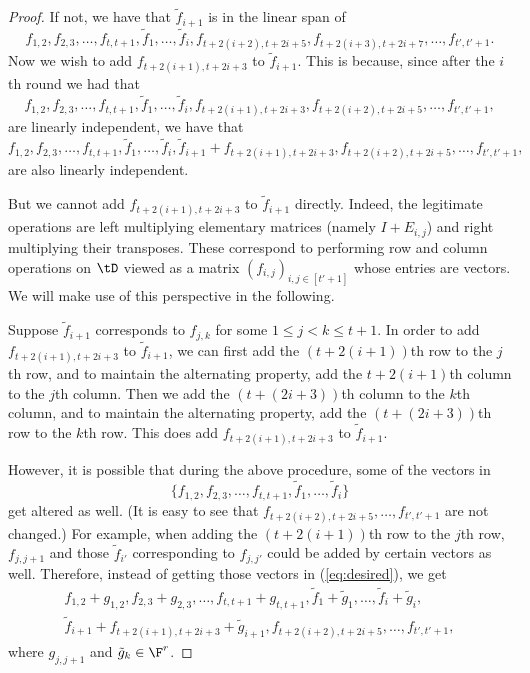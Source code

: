 \begin{proof}
If not, we have that $\tilde f_{i+1}$ is in the linear span of 
$$f_{1, 
2}, f_{2,3}, \dots, f_{t, t+1}, \tilde f_1, 
\dots, \tilde f_i, f_{t+2(i+2), t+2i+5}, 
f_{t+2(i+3), t+2i+7}, \dots, f_{t', 
t'+1}.$$ 
Now we 
wish to add $f_{t+2(i+1), t+2i+3}$ to 
$\tilde f_{i+1}$. This is because, since after the $i$th round we had that
\begin{equation}\label{eq:cond}
f_{1, 2}, f_{2,3}, 
\dots, f_{t, t+1}, \tilde f_1, 
\dots, \tilde f_i, f_{t+2(i+1), t+2i+3}, f_{t+2(i+2), t+2i+5}, \dots, f_{t', 
t'+1},
\end{equation}
are linearly independent, we have that 
\begin{equation}\label{eq:desired}
f_{1, 2}, f_{2,3}, 
\dots, f_{t, t+1}, \tilde f_1, 
\dots, \tilde f_i, \tilde f_{i+1}+f_{t+2(i+1), t+2i+3}, f_{t+2(i+2), t+2i+5}, 
\dots, f_{t', 
t'+1},
\end{equation}
are also linearly independent. 

But we cannot add $f_{t+2(i+1), t+2i+3}$ to 
$\tilde f_{i+1}$ directly. Indeed, the legitimate operations are left multiplying  
elementary matrices (namely $I+E_{i,j}$) and right multiplying 
their transposes. 
These 
correspond to performing row and column operations on $\tD$ viewed as a matrix 
$(f_{i,j})_{i,j\in[t'+1]}$ whose entries are vectors. We will make use of this 
perspective in the following. 

Suppose $\tilde f_{i+1}$ corresponds to 
$f_{j, k}$ for 
some $1\leq j<k\leq t+1$. In order to add $f_{t+2(i+1), t+2i+3}$ to 
$\tilde f_{i+1}$, we can first add the $(t+2(i+1))$th row to the $j$th row, and to 
maintain the alternating property, add 
the $t+2(i+1)$th column to the $j$th column. Then we add the $(t+(2i+3))$th column 
to the $k$th column, and to maintain the alternating property, add the 
$(t+(2i+3))$th row to the $k$th row. This does add $f_{t+2(i+1), t+2i+3}$ to 
$\tilde f_{i+1}$. 

However, it is 
possible that during the above procedure, some of the vectors in 
$$\{f_{1, 
2}, f_{2,3}, \dots, f_{t, t+1}, \tilde f_1, 
\dots, \tilde f_i\}$$ get altered as well. 
(It is easy to see that $f_{t+2(i+2), t+2i+5}, \dots, f_{t', t'+1}$ are not 
changed.)
For example, when adding the $(t+2(i+1))$th row to the $j$th row, $f_{j, j+1}$ and 
those $\tilde f_{i'}$ corresponding to $f_{j, j'}$ could be added by certain 
vectors as 
well. 
Therefore, instead of getting those vectors in (\ref{eq:desired}), we 
 get
\begin{multline}\label{eq:actual}
 f_{1, 2}+g_{1,2}, f_{2,3}+g_{2,3}, 
\dots, f_{t, t+1}+g_{t,t+1}, \tilde f_1+\tilde g_1, 
\dots, \tilde f_i+\tilde g_i, \\
 \tilde f_{i+1}+f_{t+2(i+1), t+2i+3}+\tilde g_{i+1}, f_{t+2(i+2), t+2i+5}, \dots, 
 f_{t', t'+1},
\end{multline}
where $g_{j,j+1}$ and $\tilde g_k\in \F^r$. 


\end{proof}
